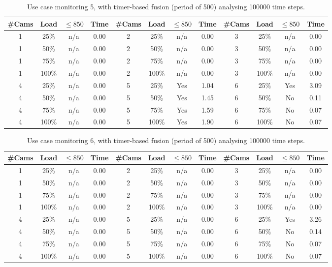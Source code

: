 \documentclass{article}
\begin{document}
\begin{table}
\centering
\begin{tabular}{|c|c|c|c|c|c|c|c|c|c|c|c|}
\hline
\#Cams & Load & $\leq 850$ & Time & \#Cams & Load & $\leq 850$ & Time & \#Cams & Load & $\leq 850$ & Time\\
\hline
1 & 25\% & n/a & 0.00 & 2 & 25\% & n/a & 0.00 & 3 & 25\% & n/a & 0.00\\
1 & 50\% & n/a & 0.00 & 2 & 50\% & n/a & 0.00 & 3 & 50\% & n/a & 0.00\\
1 & 75\% & n/a & 0.00 & 2 & 75\% & n/a & 0.00 & 3 & 75\% & n/a & 0.00\\
1 & 100\% & n/a & 0.00 & 2 & 100\% & n/a & 0.00 & 3 & 100\% & n/a & 0.00\\
\hline
4 & 25\% & n/a & 0.00 & 5 & 25\% & Yes & 1.04 & 6 & 25\% & Yes & 3.09\\
4 & 50\% & n/a & 0.00 & 5 & 50\% & Yes & 1.45 & 6 & 50\% & No & 0.11\\
4 & 75\% & n/a & 0.00 & 5 & 75\% & Yes & 1.59 & 6 & 75\% & No & 0.07\\
4 & 100\% & n/a & 0.00 & 5 & 100\% & Yes & 1.90 & 6 & 100\% & No & 0.07\\
\hline
\end{tabular}
\caption{Use case monitoring 5, with timer-based fusion (period of 500) analysing 100000 time steps.}
\end{table}


\begin{table}
\centering
\begin{tabular}{|c|c|c|c|c|c|c|c|c|c|c|c|}
\hline
\#Cams & Load & $\leq 850$ & Time & \#Cams & Load & $\leq 850$ & Time & \#Cams & Load & $\leq 850$ & Time\\
\hline
1 & 25\% & n/a & 0.00 & 2 & 25\% & n/a & 0.00 & 3 & 25\% & n/a & 0.00\\
1 & 50\% & n/a & 0.00 & 2 & 50\% & n/a & 0.00 & 3 & 50\% & n/a & 0.00\\
1 & 75\% & n/a & 0.00 & 2 & 75\% & n/a & 0.00 & 3 & 75\% & n/a & 0.00\\
1 & 100\% & n/a & 0.00 & 2 & 100\% & n/a & 0.00 & 3 & 100\% & n/a & 0.00\\
\hline
4 & 25\% & n/a & 0.00 & 5 & 25\% & n/a & 0.00 & 6 & 25\% & Yes & 3.26\\
4 & 50\% & n/a & 0.00 & 5 & 50\% & n/a & 0.00 & 6 & 50\% & No & 0.14\\
4 & 75\% & n/a & 0.00 & 5 & 75\% & n/a & 0.00 & 6 & 75\% & No & 0.07\\
4 & 100\% & n/a & 0.00 & 5 & 100\% & n/a & 0.00 & 6 & 100\% & No & 0.07\\
\hline
\end{tabular}
\caption{Use case monitoring 6, with timer-based fusion (period of 500) analysing 100000 time steps.}
\end{table}
\end{document}
